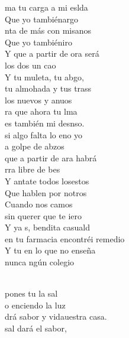 \documentclass[12pt]{article}
\begin{document}
\begin{multicols*}{2}
\begin{cancion}%
	ma tu carga a mi eslda\\
	Que yo tambiénargo\\
	nta de más con misanos\\
	Que yo tambiéniro\\
	Y  que a partir de ora será\\
	 los dos un cao\\
	Y tu muleta, tu abgo,\\
	tu almohada y tus trass\\
	los nuevos y anuos\\
\jump
	ra que ahora tu lma\\
	es también mi desnso.\\
	 si algo falta lo eno yo\\
	a golpe de abzos\\
	que a partir de ara habrá\\
	rra libre de bes\\
	Y antate todos losestos\\
	Que hablen por notros\\
	Cuando nos camos\\
\jump
	 sin querer que te iero\\
	Y ya s, bendita casuald\\
	 en tu farmacia encontréi remedio\\
	Y tu en  lo que no enseña  \\
	nunca ngún colegio\\\jump\\
	\begin{chorus}%
	 pones tu la sal \\
	o enciendo la luz\\
	drá sabor y vidauestra casa.\\
	 sal dará el sabor, \\

\end{chorus}
\end{cancion}
\end{multicols*}
\end{document}
